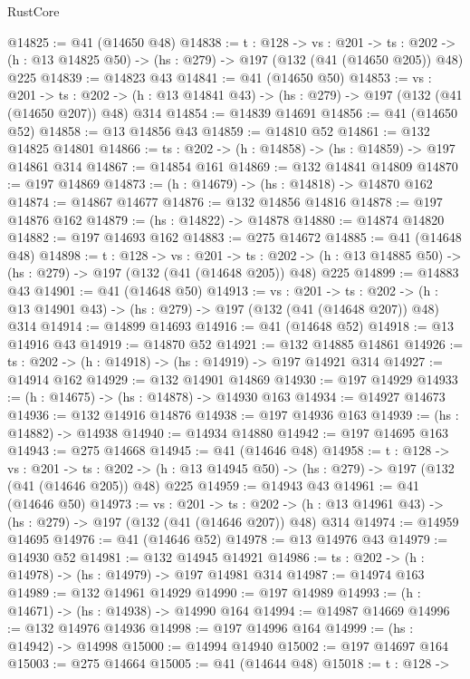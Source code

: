 \begin{lexlean}{RustCore}
\begin{coremodule}
@14825 := @41 (@14650 @48)
@14838 := {t : @128} ->
  {vs : @201} ->
  {ts : @202} -> (h : @13 @14825 @50) -> (hs : @279) -> @197 (@132 (@41 (@14650 @205)) @48) @225
@14839 := @14823 @43
@14841 := @41 (@14650 @50)
@14853 := {vs : @201} ->
  {ts : @202} -> (h : @13 @14841 @43) -> (hs : @279) -> @197 (@132 (@41 (@14650 @207)) @48) @314
@14854 := @14839 @14691
@14856 := @41 (@14650 @52)
@14858 := @13 @14856 @43
@14859 := @14810 @52
@14861 := @132 @14825 @14801
@14866 := {ts : @202} -> (h : @14858) -> (hs : @14859) -> @197 @14861 @314
@14867 := @14854 @161
@14869 := @132 @14841 @14809
@14870 := @197 @14869
@14873 := (h : @14679) -> (hs : @14818) -> @14870 @162
@14874 := @14867 @14677
@14876 := @132 @14856 @14816
@14878 := @197 @14876 @162
@14879 := (hs : @14822) -> @14878
@14880 := @14874 @14820
@14882 := @197 @14693 @162
@14883 := @275 @14672
@14885 := @41 (@14648 @48)
@14898 := {t : @128} ->
  {vs : @201} ->
  {ts : @202} -> (h : @13 @14885 @50) -> (hs : @279) -> @197 (@132 (@41 (@14648 @205)) @48) @225
@14899 := @14883 @43
@14901 := @41 (@14648 @50)
@14913 := {vs : @201} ->
  {ts : @202} -> (h : @13 @14901 @43) -> (hs : @279) -> @197 (@132 (@41 (@14648 @207)) @48) @314
@14914 := @14899 @14693
@14916 := @41 (@14648 @52)
@14918 := @13 @14916 @43
@14919 := @14870 @52
@14921 := @132 @14885 @14861
@14926 := {ts : @202} -> (h : @14918) -> (hs : @14919) -> @197 @14921 @314
@14927 := @14914 @162
@14929 := @132 @14901 @14869
@14930 := @197 @14929
@14933 := (h : @14675) -> (hs : @14878) -> @14930 @163
@14934 := @14927 @14673
@14936 := @132 @14916 @14876
@14938 := @197 @14936 @163
@14939 := (hs : @14882) -> @14938
@14940 := @14934 @14880
@14942 := @197 @14695 @163
@14943 := @275 @14668
@14945 := @41 (@14646 @48)
@14958 := {t : @128} ->
  {vs : @201} ->
  {ts : @202} -> (h : @13 @14945 @50) -> (hs : @279) -> @197 (@132 (@41 (@14646 @205)) @48) @225
@14959 := @14943 @43
@14961 := @41 (@14646 @50)
@14973 := {vs : @201} ->
  {ts : @202} -> (h : @13 @14961 @43) -> (hs : @279) -> @197 (@132 (@41 (@14646 @207)) @48) @314
@14974 := @14959 @14695
@14976 := @41 (@14646 @52)
@14978 := @13 @14976 @43
@14979 := @14930 @52
@14981 := @132 @14945 @14921
@14986 := {ts : @202} -> (h : @14978) -> (hs : @14979) -> @197 @14981 @314
@14987 := @14974 @163
@14989 := @132 @14961 @14929
@14990 := @197 @14989
@14993 := (h : @14671) -> (hs : @14938) -> @14990 @164
@14994 := @14987 @14669
@14996 := @132 @14976 @14936
@14998 := @197 @14996 @164
@14999 := (hs : @14942) -> @14998
@15000 := @14994 @14940
@15002 := @197 @14697 @164
@15003 := @275 @14664
@15005 := @41 (@14644 @48)
@15018 := {t : @128} ->

\end{coremodule}
\end{lexlean}

